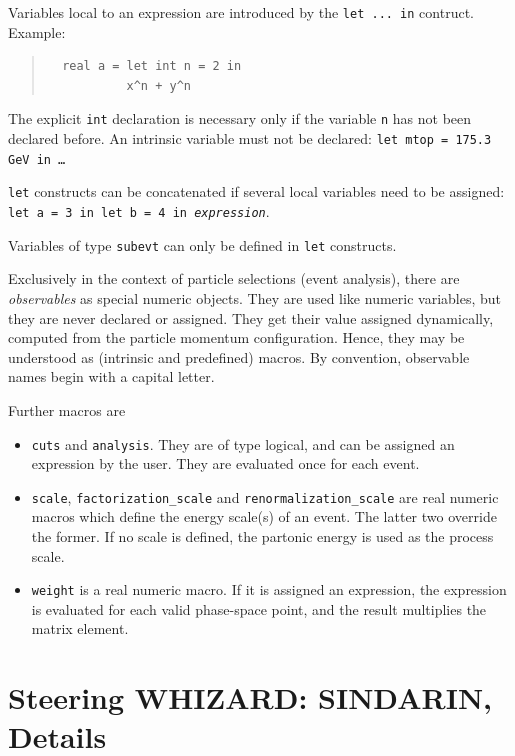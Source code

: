 \documentclass[12pt]{book}
\newcommand{\ttt}[1]{\texttt{#1}}
\begin{document}
Variables local to an expression are introduced by the \ttt{let ... in}
contruct.  Example:
\begin{quote}
\begin{footnotesize}
\begin{verbatim}
  real a = let int n = 2 in
           x^n + y^n 
\end{verbatim}
\end{footnotesize}
\end{quote}
The explicit \ttt{int} declaration is necessary only if the variable \ttt{n}
has not been declared before.  An intrinsic variable must not be declared:
\ttt{let mtop = 175.3 GeV in \ldots}

\ttt{let} constructs can be concatenated if several local variables need to
be assigned: \ttt{let a = 3 in let b = 4 in \textit{expression}}.

Variables of type \ttt{subevt} can only be defined in \ttt{let} constructs.

Exclusively in the context of particle selections (event analysis), there are
\emph{observables} as special numeric objects.  They are used like numeric
variables, but they are never declared or assigned.  They get their value
assigned dynamically, computed from the particle momentum configuration.
Hence, they may be understood as (intrinsic and predefined) macros.
By convention, observable names begin with a capital letter.

Further macros are
\begin{itemize}
\item
  \ttt{cuts} and \ttt{analysis}.  They are of type logical, and can be
  assigned an expression by the user.  They are evaluated once for
  each event.
\item
  \ttt{scale}, \ttt{factorization\_scale} and
  \ttt{renormalization\_scale} are real numeric macros which define the
  energy scale(s) of an event.  The latter two override the former.
  If no scale is defined, the partonic energy is used as the process scale.
\item 
  \ttt{weight} is a real numeric macro.  If it is assigned an
  expression, the expression is evaluated for each valid phase-space
  point, and the result multiplies the matrix element.
\end{itemize}


\chapter{Steering WHIZARD: SINDARIN, Details}
\label{chap:sindarin}
\end{document}
